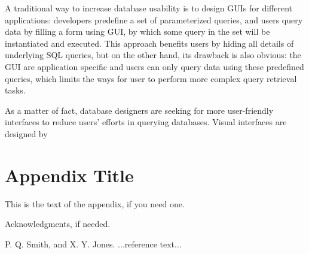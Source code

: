 \documentclass[preprint]{sigplanconf}
\begin{document}
A traditional way to increase database usability is to design GUIs for different applications: developers predefine a set of parameterized queries, and users query data by filling a form using GUI, by which some query in the set will be instantiated and executed. This approach benefits users by hiding all details of underlying SQL queries, but on the other hand, its drawback is also obvious: the GUI are application specific and users can only query data using these predefined queries, which limits the ways for user to perform more complex query retrieval tasks. 

As a matter of fact, database designers are seeking for more user-friendly interfaces to reduce users' efforts in querying databases. Visual interfaces are designed by 

\appendix
\section{Appendix Title}

This is the text of the appendix, if you need one.

\acks

Acknowledgments, if needed.





\begin{thebibliography}{}
\softraggedright

P. Q. Smith, and X. Y. Jones. ...reference text...

\end{thebibliography}
\end{document}

